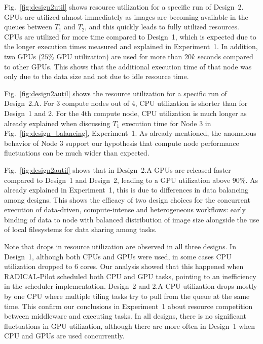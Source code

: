 Fig.~\ref{fig:design2util} shows resource utilization for a specific run of
Design~2. GPUs are utilized almost immediately as images are becoming
available in the queues between $T_{1}$ and $T_{2}$, and this quickly leads
to fully utilized resources. CPUs are utilized for more time compared to
Design~1, which is expected due to the longer execution times measured and
explained in Experiment~1. In addition, two GPUs ($25\%$ GPU utilization) are
used for more than $20k$ seconds compared to other GPUs. This shows that the
additional execution time of that node was only due to the data size and not
due to idle resource time.

Fig.~\ref{fig:design2autil} shows the resource utilization for a specific run
of Design~2.A. For 3 compute nodes out of 4, CPU utilization is shorter than
for Design~1 and 2. For the 4th compute node, CPU utilization is much longer
as already explained when discussing $T_{1}$ execution time for Node 3 in
Fig.~\ref{fig:design_balancing}, Experiment~1. As already mentioned, the
anomalous behavior of Node 3 support our hypothesis that compute node
performance fluctuations can be much wider than expected.

Fig.~\ref{fig:design2autil} shows that in Design~2.A GPUs are released faster
compared to Design~1 and Design~2, leading to a GPU utilization above $90\%$.
As already explained in Experiment~1, this is due to differences in data
balancing among designs. This shows the efficacy of two design choices for
the concurrent execution of data-driven, compute-intense and heterogeneous
workflows: early binding of data to node with balanced distribution of image
size alongside the use of local filesystems for data sharing among tasks.

Note that drops in resource utilization are observed in all three designs. In
Design~1, although both CPUs and GPUs were used, in some cases CPU
utilization dropped to 6 cores. Our analysis showed that this happened when
RADICAL-Pilot scheduled both CPU and GPU tasks, pointing to an inefficiency
in the scheduler implementation. Design~2 and 2.A CPU utilization drops
mostly by one CPU where multiple tiling tasks try to pull from the queue at
the same time. This confirm our conclusions in Experiment~1 about resource
competition between middleware and executing tasks. In all designs, there is
no significant fluctuations in GPU utilization, although there are more often
in Design~1 when CPU and GPUs are used concurrently.

